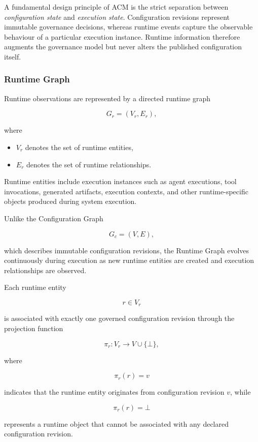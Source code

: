 \documentclass[10pt]{article}
\begin{document}
A fundamental design principle of ACM is the strict separation between
\emph{configuration state} and \emph{execution state}. Configuration revisions
represent immutable governance decisions, whereas runtime events capture the
observable behaviour of a particular execution instance. Runtime information
therefore augments the governance model but never alters the published
configuration itself.

\subsubsection{Runtime Graph}

Runtime observations are represented by a directed runtime graph

\[
G_r=(V_r,E_r),
\tag{25}
\]

where

\begin{itemize}
    \item $V_r$ denotes the set of runtime entities,
    \item $E_r$ denotes the set of runtime relationships.
\end{itemize}

Runtime entities include execution instances such as agent executions,
tool invocations, generated artifacts, execution contexts, and other
runtime-specific objects produced during system execution.

Unlike the Configuration Graph

\[
G_c=(V,E),
\]

which describes immutable configuration revisions, the Runtime Graph evolves
continuously during execution as new runtime entities are created and execution
relationships are observed.

Each runtime entity

\[
r\in V_r
\]

is associated with exactly one governed configuration revision through the
projection function

\[
\pi_r :
V_r
\rightarrow
V \cup \{\bot\},
\tag{26}
\]

where

\[
\pi_r(r)=v
\]

indicates that the runtime entity originates from configuration revision
$v$, while

\[
\pi_r(r)=\bot
\]

represents a runtime object that cannot be associated with any declared
configuration revision.
\end{document}
